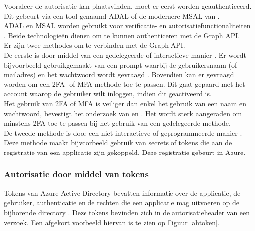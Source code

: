 
Vooraleer de autorisatie kan plaatsvinden, moet er eerst worden geauthenticeerd. Dit gebeurt via een tool genaamd \ac{ADAL} of de modernere \ac{MSAL} van \textcite{Microsoft2022d}. \\

\ac{ADAL} en \ac{MSAL} worden gebruikt voor verificatie- en autorisatiefunctionaliteiten \autocite{Ooms2022}. Beide technologieën dienen om te kunnen authenticeren met de Graph \ac{API}. \\ 

Er zijn twee methodes om te verbinden met de Graph \ac{API}. \\

De eerste is door middel van een gedelegeerde of interactieve manier \autocite{Microsoft2023u}. Er wordt bijvoorbeeld gebruikgemaakt van een prompt waarbij de gebruikersnaam (of mailadres) en het wachtwoord wordt gevraagd \autocite{Bertocci2015}. Bovendien kan er gevraagd worden om een \ac{2FA}- of \ac{MFA}-methode toe te passen. Dit gaat gepaard met het account waarop de gebruiker wilt inloggen, indien dit geactiveerd is. \\

Het gebruik van \ac{2FA} of \ac{MFA} is veiliger dan enkel het gebruik van een naam en wachtwoord, bevestigt het onderzoek van \textcite{Gunson2011} en \textcite{Banyal2013}. Het wordt sterk aangeraden om minstens \ac{2FA} toe te passen bij het gebruik van een gedelegeerde methode. \\

De tweede methode is door een niet-interactieve of geprogrammeerde manier \autocite{Microsoft2023t}. Deze methode maakt bijvoorbeeld gebruik van secrets of tokens die aan de registratie van een applicatie zijn gekoppeld. Deze registratie gebeurt in Azure. 



\subsubsection{Autorisatie door middel van tokens}


Tokens van Azure Active Directory bevatten informatie over de applicatie, de gebruiker, authenticatie en de rechten die een applicatie mag uitvoeren op de bijhorende directory \autocite{Microsoft2015}. Deze tokens bevinden zich in de autorisatieheader van een verzoek. Een afgekort voorbeeld hiervan is te zien op Figuur \ref{ahtoken}. \\

